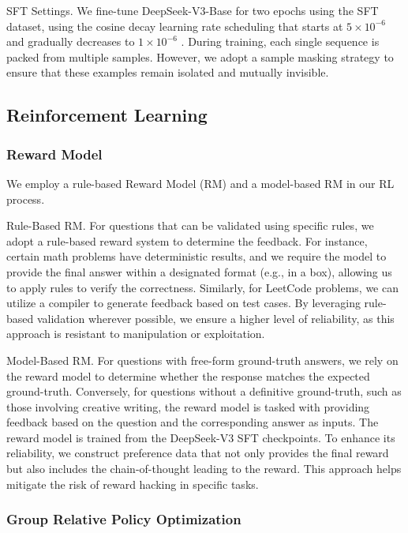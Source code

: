 \documentclass[11pt,a4paper]{article}
\begin{document}
SFT Settings. We fine-tune DeepSeek-V3-Base for two epochs using the SFT dataset, using the cosine decay learning rate scheduling that starts at  $5 \times 10^{-6}$  and gradually decreases to  $1 \times 10^{-6}$ . During training, each single sequence is packed from multiple samples. However, we adopt a sample masking strategy to ensure that these examples remain isolated and mutually invisible.

\subsection{Reinforcement Learning}

\subsubsection{Reward Model}

We employ a rule-based Reward Model (RM) and a model-based RM in our RL process.

Rule-Based RM. For questions that can be validated using specific rules, we adopt a rule-based reward system to determine the feedback. For instance, certain math problems have deterministic results, and we require the model to provide the final answer within a designated format (e.g., in a box), allowing us to apply rules to verify the correctness. Similarly, for LeetCode problems, we can utilize a compiler to generate feedback based on test cases. By leveraging rule-based validation wherever possible, we ensure a higher level of reliability, as this approach is resistant to manipulation or exploitation.

Model-Based RM. For questions with free-form ground-truth answers, we rely on the reward model to determine whether the response matches the expected ground-truth. Conversely, for questions without a definitive ground-truth, such as those involving creative writing, the reward model is tasked with providing feedback based on the question and the corresponding answer as inputs. The reward model is trained from the DeepSeek-V3 SFT checkpoints. To enhance its reliability, we construct preference data that not only provides the final reward but also includes the chain-of-thought leading to the reward. This approach helps mitigate the risk of reward hacking in specific tasks.

\subsubsection{Group Relative Policy Optimization}
\end{document}
